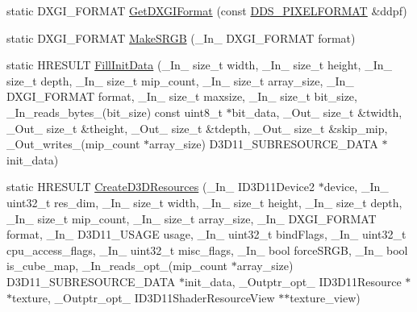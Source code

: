 \begin{DoxyCompactItemize}
\item 
static D\+X\+G\+I\+\_\+\+F\+O\+R\+M\+AT \hyperlink{namespacemage_a4fecf9823aec7c5ba078acf6bd73f983}{Get\+D\+X\+G\+I\+Format} (const \hyperlink{structmage_1_1_d_d_s___p_i_x_e_l_f_o_r_m_a_t}{D\+D\+S\+\_\+\+P\+I\+X\+E\+L\+F\+O\+R\+M\+AT} \&ddpf)
\item 
static D\+X\+G\+I\+\_\+\+F\+O\+R\+M\+AT \hyperlink{namespacemage_a35ccdb42bbc027d3678b849fb962f3d3}{Make\+S\+R\+GB} (\+\_\+\+In\+\_\+ D\+X\+G\+I\+\_\+\+F\+O\+R\+M\+AT format)
\item 
static H\+R\+E\+S\+U\+LT \hyperlink{namespacemage_ac20162a68be6828c38072a3afb0711c1}{Fill\+Init\+Data} (\+\_\+\+In\+\_\+ size\+\_\+t width, \+\_\+\+In\+\_\+ size\+\_\+t height, \+\_\+\+In\+\_\+ size\+\_\+t depth, \+\_\+\+In\+\_\+ size\+\_\+t mip\+\_\+count, \+\_\+\+In\+\_\+ size\+\_\+t array\+\_\+size, \+\_\+\+In\+\_\+ D\+X\+G\+I\+\_\+\+F\+O\+R\+M\+AT format, \+\_\+\+In\+\_\+ size\+\_\+t maxsize, \+\_\+\+In\+\_\+ size\+\_\+t bit\+\_\+size, \+\_\+\+In\+\_\+reads\+\_\+bytes\+\_\+(bit\+\_\+size) const uint8\+\_\+t $\ast$bit\+\_\+data, \+\_\+\+Out\+\_\+ size\+\_\+t \&twidth, \+\_\+\+Out\+\_\+ size\+\_\+t \&theight, \+\_\+\+Out\+\_\+ size\+\_\+t \&tdepth, \+\_\+\+Out\+\_\+ size\+\_\+t \&skip\+\_\+mip, \+\_\+\+Out\+\_\+writes\+\_\+(mip\+\_\+count $\ast$array\+\_\+size) D3\+D11\+\_\+\+S\+U\+B\+R\+E\+S\+O\+U\+R\+C\+E\+\_\+\+D\+A\+TA $\ast$init\+\_\+data)
\item 
static H\+R\+E\+S\+U\+LT \hyperlink{namespacemage_a45746b9c8018b682c999fe1c5d4158db}{Create\+D3\+D\+Resources} (\+\_\+\+In\+\_\+ I\+D3\+D11\+Device2 $\ast$device, \+\_\+\+In\+\_\+ uint32\+\_\+t res\+\_\+dim, \+\_\+\+In\+\_\+ size\+\_\+t width, \+\_\+\+In\+\_\+ size\+\_\+t height, \+\_\+\+In\+\_\+ size\+\_\+t depth, \+\_\+\+In\+\_\+ size\+\_\+t mip\+\_\+count, \+\_\+\+In\+\_\+ size\+\_\+t array\+\_\+size, \+\_\+\+In\+\_\+ D\+X\+G\+I\+\_\+\+F\+O\+R\+M\+AT format, \+\_\+\+In\+\_\+ D3\+D11\+\_\+\+U\+S\+A\+GE usage, \+\_\+\+In\+\_\+ uint32\+\_\+t bind\+Flags, \+\_\+\+In\+\_\+ uint32\+\_\+t cpu\+\_\+access\+\_\+flags, \+\_\+\+In\+\_\+ uint32\+\_\+t misc\+\_\+flags, \+\_\+\+In\+\_\+ bool force\+S\+R\+GB, \+\_\+\+In\+\_\+ bool is\+\_\+cube\+\_\+map, \+\_\+\+In\+\_\+reads\+\_\+opt\+\_\+(mip\+\_\+count $\ast$array\+\_\+size) D3\+D11\+\_\+\+S\+U\+B\+R\+E\+S\+O\+U\+R\+C\+E\+\_\+\+D\+A\+TA $\ast$init\+\_\+data, \+\_\+\+Outptr\+\_\+opt\+\_\+ I\+D3\+D11\+Resource $\ast$$\ast$texture, \+\_\+\+Outptr\+\_\+opt\+\_\+ I\+D3\+D11\+Shader\+Resource\+View $\ast$$\ast$texture\+\_\+view)
\item 

\end{DoxyCompactItemize}
